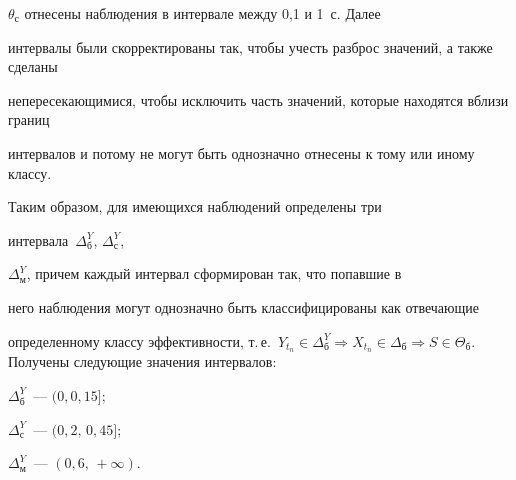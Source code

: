 $\theta_{\mathrm{с}}$ отнесены наблюдения в интервале между 0,1 и 1~с. Далее 


интервалы были скорректированы так, чтобы учесть разброс значений, а также сделаны 


непересекающимися, чтобы исключить часть значений, которые находятся вблизи границ 


интервалов и потому не могут быть однозначно отнесены к тому или иному классу.


      


      Таким образом, для имеющихся наблюдений определены три 


интервала~$\Delta_{\mathrm{б}}^Y$,  $\Delta_{\mathrm{с}}^Y$, 


$\Delta_{\mathrm{м}}^Y$, причем каждый интервал сформирован так, что попавшие в 


него наблюдения могут однозначно быть классифицированы как отвечающие 


определенному классу эффективности, т.\,е.\ $Y_{t_n}\in 


\Delta^Y_{\mathrm{б}}\Rightarrow X_{t_n}\in \Delta_{\mathrm{б}}\Rightarrow 


S\in\Theta_{\mathrm{б}}$. Получены следующие значения интервалов: 




















$\Delta^Y_{\mathrm{б}}$~--- $(0, 0{,}15]$;


 $\Delta^Y_{\mathrm{с}}$~--- $(0{,}2,\, 0{,}45]$;


 $\Delta^Y_{\mathrm{м}}$~--- $(0{,}6,\, +\infty)$.








